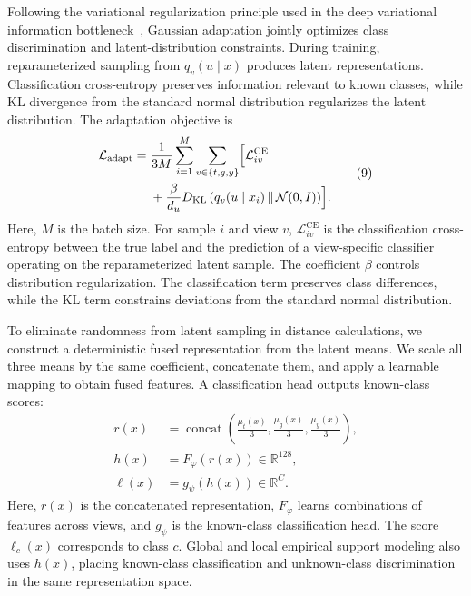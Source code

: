 Following the variational regularization principle used in the deep variational information bottleneck~, Gaussian adaptation jointly optimizes class discrimination and latent-distribution constraints. During training, reparameterized sampling from $q_v(u\mid x)$ produces latent representations. Classification cross-entropy preserves information relevant to known classes, while KL divergence from the standard normal distribution regularizes the latent distribution. The adaptation objective is
\begin{equation}
\begin{aligned}
\mathcal{L}_{\mathrm{adapt}}={}&\frac{1}{3M}\sum_{i=1}^{M}\sum_{v\in\{t,g,y\}}\Bigl[\mathcal L^{\mathrm{CE}}_{iv}\\
&+\frac{\beta}{d_u}D_{\mathrm{KL}}\left(q_v(u\mid x_i)\,\|\,\mathcal N(0,I)\right)\Bigr].
\end{aligned}\tag{9}
\end{equation}
Here, $M$ is the batch size. For sample $i$ and view $v$, $\mathcal L^{\mathrm{CE}}_{iv}$ is the classification cross-entropy between the true label and the prediction of a view-specific classifier operating on the reparameterized latent sample. The coefficient $\beta$ controls distribution regularization. The classification term preserves class differences, while the KL term constrains deviations from the standard normal distribution.

To eliminate randomness from latent sampling in distance calculations, we construct a deterministic fused representation from the latent means. We scale all three means by the same coefficient, concatenate them, and apply a learnable mapping to obtain fused features. A classification head outputs known-class scores:
\begin{equation}
\begin{aligned}
r(x)&=
\operatorname{concat}
\left(
\frac{\mu_t(x)}{3},
\frac{\mu_g(x)}{3},
\frac{\mu_y(x)}{3}
\right),\\
h(x)&=F_{\varphi}(r(x))\in\mathbb{R}^{128},\\
\ell(x)&=g_{\psi}(h(x))\in\mathbb{R}^{C}.
\end{aligned}
\tag{10}
\end{equation}
Here, $r(x)$ is the concatenated representation, $F_{\varphi}$ learns combinations of features across views, and $g_{\psi}$ is the known-class classification head. The score $\ell_c(x)$ corresponds to class $c$. Global and local empirical support modeling also uses $h(x)$, placing known-class classification and unknown-class discrimination in the same representation space.

